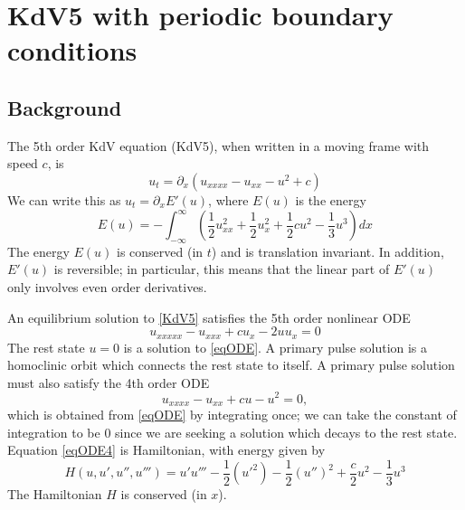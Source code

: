 \documentclass[thesis.tex]{subfiles}
\begin{document}
\chapter{KdV5 with periodic boundary conditions}

\section{Background}

The 5th order KdV equation (KdV5), when written in a moving frame with speed $c$, is
\begin{equation}\label{KdV5}
u_t = \partial_x(u_{xxxx} - u_{xx} - u^2 + c) 
\end{equation}
We can write this as $u_t = \partial_x E'(u)$, where $E(u)$ is the energy
\begin{equation}\label{energy}
E(u) = -\int_{-\infty}^{\infty} \left( \frac{1}{2}u_{xx}^2 + \frac{1}{2}u_x^2 + \frac{1}{2}cu^2 - \frac{1}{3}u^3 \right) dx
\end{equation}
The energy $E(u)$ is conserved (in $t$) and is translation invariant. In addition, $E'(u)$ is reversible; in particular, this means that the linear part of $E'(u)$ only involves even order derivatives.

An equilibrium solution to \eqref{KdV5} satisfies the 5th order nonlinear ODE
\begin{equation}\label{eqODE}
u_{xxxxx} - u_{xxx} + c u_x - 2 u u_x = 0
\end{equation}
The rest state $u = 0$ is a solution to \eqref{eqODE}. A primary pulse solution is a homoclinic orbit which connects the rest state to itself. A primary pulse solution must also satisfy the 4th order ODE
\begin{equation}\label{eqODE4}
u_{xxxx} - u_{xx} + c u - u^2 = 0,
\end{equation}
which is obtained from \eqref{eqODE} by integrating once; we can take the constant of integration to be 0 since we are seeking a solution which decays to the rest state. Equation \eqref{eqODE4} is Hamiltonian, with energy given by
\begin{equation}\label{Hamiltonian}
H(u, u', u'', u''') = u'u''' - \frac{1}{2}(u'^2) - \frac{1}{2}(u'')^2 + \frac{c}{2}u^2 - \frac{1}{3}u^3 
\end{equation}
The Hamiltonian $H$ is conserved (in $x$).
\end{document}
